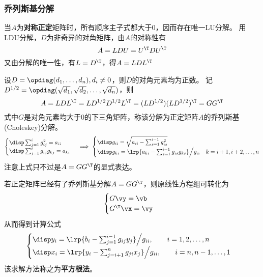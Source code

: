 \subsubsection{乔列斯基分解}
当$A$为\textbf{对称正定}矩阵时，所有顺序主子式都大于$0$，因而存在唯一LU分解。
用LDU分解，$D$为非奇异的对角矩阵，由$A$的对称性有
\[A=LDU=U^\T D U^\T\]
又由分解的唯一性，有$L=D^\T$，得$A=LDL^\T$

设$D=\opdiag(d_1,\ldots,d_n),d_i\ne 0$，则$D$的对角元素均为正数。
记$D^{1/2}=\opdiag(\sqrt{d_1},\sqrt{d_2},\ldots,\sqrt{d_n})$，则
\[A=LDL^\T=LD^{1/2}D^{1/2}L^\T=(LD^{1/2})(LD^{1/2})^\T=GG^\T\]
式中$G$是对角元素均大于$0$的下三角矩阵，称该分解为正定矩阵$A$的乔列斯基(Choleskey)分解。
\[\begin{cases}
    \disp \sum_{j=1}^i g_{ij}^2=a_{ii}\\
    \disp \sum_{j=1}^i g_{ij}g_{kj}=a_{ki}
\end{cases}
\implies
\begin{cases}
    \disp g_{ii}=\sqrt{a_{ii}-\sum_{s=1}^{i-1}g_{is}^2}\\
    \disp g_{ki}=\lrp{a_{ki}-\sum_{s=1}^{i-1}g_{is}g_{ks}}\Big/g_{ii} & k=i+1,i+2,\ldots,n
\end{cases}\]
注意上式只不过是$A=G G^\T$的显式表达。

若正定矩阵已经有了乔列斯基分解$A=GG^\T$，则原线性方程组可转化为
\[\begin{cases}
    G\vy=\vb\\
    G^\T\vx=\vy
\end{cases}\]
从而得到计算公式
\[\begin{cases}
    \disp y_i=\lrp{b_i-\sum_{j=1}^{i-1}g_{ij}y_j}\Big/g_{ii},\qquad i=1,2,\ldots,n\\
    \disp x_i=\lrp{y_i-\sum_{j=i+1}^n g_{ji}x_j}\Big/g_{ii},\qquad i=n,n-1,\ldots,1
\end{cases}\]
该求解方法称之为\textbf{平方根法}。

